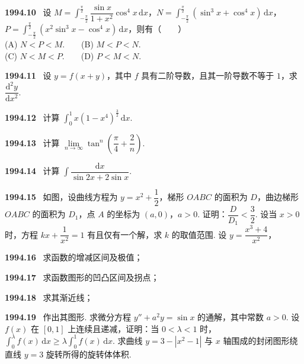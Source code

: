 \documentclass[UTF8,12pt]{ctexart}
\newcommand{\qn}[1]{\textbf{\large #1}\ }
\begin{document}
\vfill
\newpage
\qn{1994.10}
设 $M=\int_{-\frac{\pi}{2}}^{\frac{\pi}{2}}\dfrac{\sin x}{1+x^2}\cos^4 x\,\mathrm{d}x$，$N=\int_{-\frac{\pi}{2}}^{\frac{\pi}{2}}(\sin^3 x+\cos^4 x)\,\mathrm{d}x$，$P=\int_{-\frac{\pi}{2}}^{\frac{\pi}{2}}(x^2\sin^3 x-\cos^4 x)\,\mathrm{d}x$，则有（　　）
\\
\noindent (A) $N<P<M$.　　(B) $M<P<N$.
\\
\noindent (C) $N<M<P$.　　(D) $P<M<N$.

\vfill
\newpage
\qn{1994.11}
设 $y=f(x+y)$，其中 $f$ 具有二阶导数，且其一阶导数不等于 $1$，求 $\dfrac{\mathrm{d}^2y}{\mathrm{d}x^2}$.

\vfill
\newpage
\qn{1994.12}
计算 $\int_0^1 x(1-x^4)^{\frac{3}{2}}\,\mathrm{d}x$.

\vfill
\newpage
\qn{1994.13}
计算 $\lim\limits_{n\to\infty}\tan^n\left(\dfrac{\pi}{4}+\dfrac{2}{n}\right)$.

\vfill
\newpage
\qn{1994.14}
计算 $\int\dfrac{\mathrm{d}x}{\sin 2x+2\sin x}$.

\vfill
\newpage
\qn{1994.15}
如图，设曲线方程为 $y=x^2+\dfrac{1}{2}$，梯形 $OABC$ 的面积为 $D$，曲边梯形 $OABC$ 的面积为 $D_1$，点 $A$ 的坐标为 $(a,0)$，$a>0$. 证明：$\dfrac{D}{D_1}<\dfrac{3}{2}$.
设当 $x>0$ 时，方程 $kx+\dfrac{1}{x^2}=1$ 有且仅有一个解，求 $k$ 的取值范围.
设 $y=\dfrac{x^3+4}{x^2}$，

\vfill
\newpage
\qn{1994.16}
求函数的增减区间及极值；

\vfill
\newpage
\qn{1994.17}
求函数图形的凹凸区间及拐点；

\vfill
\newpage
\qn{1994.18}
求其渐近线；

\vfill
\newpage
\qn{1994.19}
作出其图形.
求微分方程 $y''+a^2y=\sin x$ 的通解，其中常数 $a>0$.
设 $f(x)$ 在 $[0,1]$ 上连续且递减，证明：当 $0<\lambda<1$ 时，$\int_0^\lambda f(x)\,\mathrm{d}x\geqslant\lambda\int_0^1 f(x)\,\mathrm{d}x$.
求曲线 $y=3-|x^2-1|$ 与 $x$ 轴围成的封闭图形绕直线 $y=3$ 旋转所得的旋转体体积.

\vfill
\newpage
\end{document}
